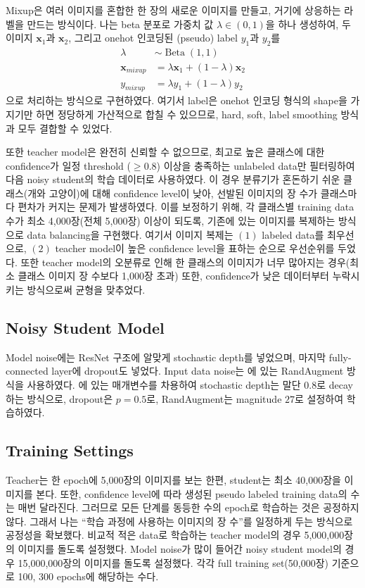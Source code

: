 \documentclass[a4paper, 10pt]{article}
\renewcommand{\vec}{\mathbf}
\begin{document}
Mixup은 여러 이미지를 혼합한 한 장의 새로운 이미지를 만들고, 거기에 상응하는
라벨을 만드는 방식이다. \cite{zhang2018mixup} 나는 beta 분포로 가중치 값
$\lambda \in (0, 1)$을 하나 생성하여, 두 이미지 $\vec x_1$과 $\vec x_2$, 그리고
onehot 인코딩된 (pseudo) label $y_1$과 $y_2$를 
\begin{align*}
  \lambda &\sim \operatorname{Beta}(1, 1)\\
  \vec x_{mixup} &= \lambda \vec x_1 + (1 - \lambda) \vec x_2 \\
  y_{mixup} &= \lambda y_1 + (1 - \lambda) y_2
\end{align*}
으로 처리하는 방식으로 구현하였다. 여기서 label은 onehot 인코딩 형식의 shape을
가지기만 하면 정당하게 가산적으로 합칠 수 있으므로, hard, soft, label smoothing
방식과 모두 결합할 수 있었다.

또한 teacher model은 완전히 신뢰할 수 없으므로, 최고로 높은 클래스에 대한
confidence가 일정 threshold ($\geq 0.8$) 이상을 충족하는 unlabeled data만
필터링하여 다음 noisy student의 학습 데이터로 사용하였다. 이 경우 분류기가
혼돈하기 쉬운 클래스(개와 고양이)에 대해 confidence level이 낮아, 선발된
이미지의 장 수가 클래스마다 편차가 커지는 문제가 발생하였다. 이를 보정하기 위해,
각 클래스별 training data 수가 최소 4,000장(전체 5,000장) 이상이 되도록, 기존에
있는 이미지를 복제하는 방식으로 data balancing을 구현했다. 여기서 이미지 복제는
$(1)$ labeled data를 최우선으로, $(2)$ teacher model이 높은 confidence level을
표하는 순으로 우선순위를 두었다. 또한 teacher model의 오분류로 인해 한 클래스의
이미지가 너무 많아지는 경우(최소 클래스 이미지 장 수보다 1,000장 초과) 또한,
confidence가 낮은 데이터부터 누락시키는 방식으로써 균형을 맞추었다.

\subsection{Noisy Student Model}
Model noise에는 ResNet 구조에 알맞게 stochastic depth를 넣었으며, 마지막
fully-connected layer에 dropout도 넣었다. Input data noise는
\cite{cubuk2019randaugment}에 있는 RandAugment 방식을 사용하였다.
\cite{xie2020selftraining}에 있는 매개변수를 차용하여 stochastic depth는 말단
0.8로 decay하는 방식으로, dropout은 $p=0.5$로, RandAugment는 magnitude $27$로
설정하여 학습하였다.

\subsection{Training Settings}
Teacher는 한 epoch에 5,000장의 이미지를 보는 한편, student는 최소 40,000장을
이미지를 본다. 또한, confidence level에 따라 생성된 pseudo labeled training
data의 수는 매번 달라진다. 그러므로 모든 단계를 동등한 수의 epoch로 학습하는
것은 공정하지 않다. 그래서 나는 ``학습 과정에 사용하는 이미지의 장 수''를
일정하게 두는 방식으로 공정성을 확보했다. 비교적 적은 data로 학습하는 teacher
model의 경우 5,000,000장의 이미지를 돌도록 설정했다. Model noise가 많이 들어간
noisy student model의 경우 15,000,000장의 이미지를 돌도록 설정했다. 각각 full
training set(50,000장) 기준으로 100, 300 epochs에 해당하는 수다.
\end{document}
